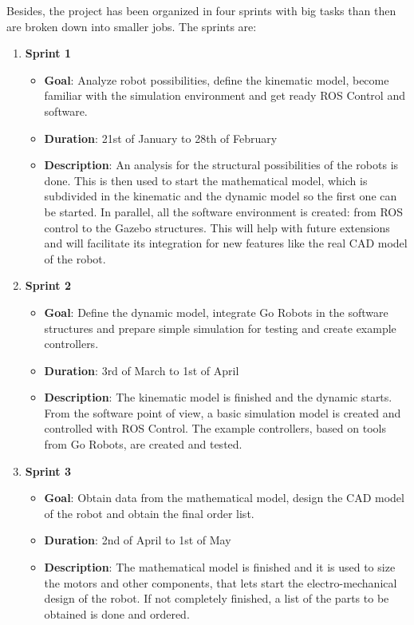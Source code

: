 Besides, the project has been organized in four sprints with big tasks than then are broken down into smaller jobs. The sprints are:
\begin{enumerate}
  \item \textbf{Sprint 1}
    \begin{itemize}
      \item \textbf{Goal}: Analyze robot possibilities, define the kinematic model, become familiar with the simulation environment and get ready ROS Control and software.
      \item \textbf{Duration}: 21st of January to 28th of February
      \item \textbf{Description}: An analysis for the structural possibilities of the robots is done. This is then used to start the mathematical model, which is subdivided in the kinematic and the dynamic model so the first one can be started. In parallel, all the software environment is created: from ROS control to the Gazebo structures. This will help with future extensions and will facilitate its integration for new features like the real CAD model of the robot.
    \end{itemize}
    \item \textbf{Sprint 2}
    \begin{itemize}
      \item \textbf{Goal}: Define the dynamic model, integrate Go Robots in the software structures and prepare simple simulation for testing and create example controllers.
      \item \textbf{Duration}: 3rd of March to 1st of April
      \item \textbf{Description}: The kinematic model is finished and the dynamic starts. From the software point of view, a basic simulation model is created and controlled with ROS Control. The example controllers, based on tools from Go Robots, are created and tested.
    \end{itemize}
  \item \textbf{Sprint 3}
    \begin{itemize}
      \item \textbf{Goal}: Obtain data from the mathematical model, design the CAD model of the robot and obtain the final order list.
      \item \textbf{Duration}: 2nd of April to 1st of May
      \item \textbf{Description}: The mathematical model is finished and it is used to size the motors and other components, that lets start the electro-mechanical design of the robot. If not completely finished, a list of the parts to be obtained is done and ordered.

\end{itemize}
\end{enumerate}
